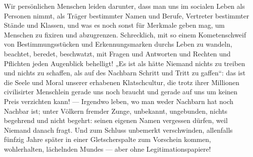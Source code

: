 Wir persönlichen Menschen leiden darunter, dass man uns im socialen Leben  als Personen nimmt, als Träger bestimmter Namen und Berufe, Vertreter bestimmter Stände und Klassen, und was es noch sonst für Merkmale geben mag, um Menschen zu fixiren und abzugrenzen. Schrecklich, mit so einem Kometenschweif von Bestimmungsstücken und Erkennungsmarken durchs Leben zu wandeln, beachtet, beredet, beschwatzt, mit Fragen und Antworten und Rechten und Pflichten jeden Augenblick behelligt! „Es ist als hätte Niemand nichts zu treiben und nichts zu schaffen, als auf des Nachbarn Schritt und Tritt zu gaffen“: das ist die Seele und Moral unserer erhabenen Klatschcultur, die trotz ihrer Millionen civilisirter Menschlein gerade uns noch braucht und gerade auf uns um keinen Preis verzichten kann! — Irgendwo leben, wo man weder Nachbarn hat noch Nachbar ist; unter Völkern fremder Zunge, unbekannt, ungebunden, nichts begehrend und nicht begehrt: seinen eigenen Namen vergessen dürfen, weil Niemand danach fragt. Und zum Schluss unbemerkt verschwinden, allenfalls fünfzig Jahre später in einer Gletscherspalte zum Vorschein kommen, wohlerhalten, lächelnden Mundes — aber ohne Legitimationspapiere!
\par

